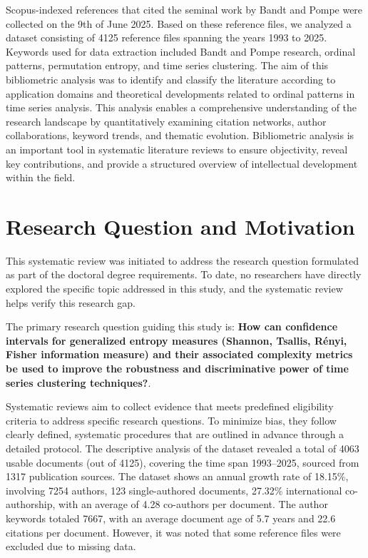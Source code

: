 Scopus-indexed references that cited the seminal work by Bandt and Pompe were collected on the 9th of June 2025. Based on these reference files, we analyzed a dataset consisting of 4125 reference files spanning the years 1993 to 2025. Keywords used for data extraction included Bandt and Pompe research, ordinal patterns, permutation entropy, and time series clustering. The aim of this bibliometric analysis was to identify and classify the literature according to application domains and theoretical developments related to ordinal patterns in time series analysis. This analysis enables a comprehensive understanding of the research landscape by quantitatively examining citation networks, author collaborations, keyword trends, and thematic evolution. Bibliometric analysis is an important tool in systematic literature reviews to ensure objectivity, reveal key contributions, and provide a structured overview of intellectual development within the field.

\section{Research Question and Motivation}
This systematic review was initiated to address the research question formulated as part of the doctoral degree requirements. To date, no researchers have directly explored the specific topic addressed in this study, and the systematic review helps verify this research gap.

The primary research question guiding this study is:
\textbf{How can confidence intervals for generalized entropy measures (Shannon, Tsallis, Rényi, Fisher information measure) and their associated complexity metrics be used to improve the robustness and discriminative power of time series clustering techniques?}.

Systematic reviews aim to collect evidence that meets predefined eligibility criteria to address specific research questions. To minimize bias, they follow clearly defined, systematic procedures that are outlined in advance through a detailed protocol. The descriptive analysis of the dataset revealed a total of 4063 usable documents (out of 4125), covering the time span 1993–2025, sourced from 1317 publication sources. The dataset shows an annual growth rate of 18.15\%, involving 7254 authors, 123 single-authored documents, 27.32\% international co-authorship, with an average of 4.28 co-authors per document. The author keywords totaled 7667, with an average document age of 5.7 years and 22.6 citations per document. However, it was noted that some reference files were excluded due to missing data.

